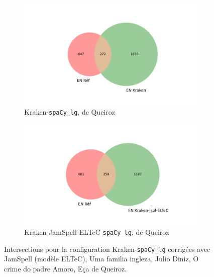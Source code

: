 \begin{figure}
\begin{minipage}{7cm}
  \begin{subfigure}{1\textwidth}
  \includegraphics[width=1\textwidth]{IMAGES/ELTeC_INTERSECTIONS_spaCy3.5.1/DE-QUEIROS_o-crime-do-padre-ama_krakenbase.txt_spacy-lg-concat.json_intersection.png} 
  \caption{Kraken-\texttt{spaCy\_lg}, de Queiroz}
  \label{fig:DE_QUEIROZ_INTERSECTION_sous_fig}
  \end{subfigure}
  \end{minipage}
  \begin{minipage}{7cm}
  \begin{subfigure}{1\textwidth}
  \includegraphics[width=1\textwidth]{IMAGES/ELTeC_INTERSECTIONS_spaCy3.5.1/DE-QUEIROS_o-crime-do-padre-ama_krakenbase_jamspell-ELTeCmodel-por.txt_spacy-lg-concat.json_intersection.png}
  \caption{Kraken-JamSpell-ELTeC-\texttt{spaCy\_lg}, de Queiroz}
  \end{subfigure}
    \end{minipage}
\caption{Intersections pour la configuration Kraken-\texttt{spaCy\_lg} corrigées avec JamSpell (modèle ELTeC), {\normalfont Uma familia ingleza}, Julio Diniz, {\normalfont O crime do padre Amoro}, Eça de Queiroz.}
\label{fig:intersection_diniz-dequeiros}
\end{figure}